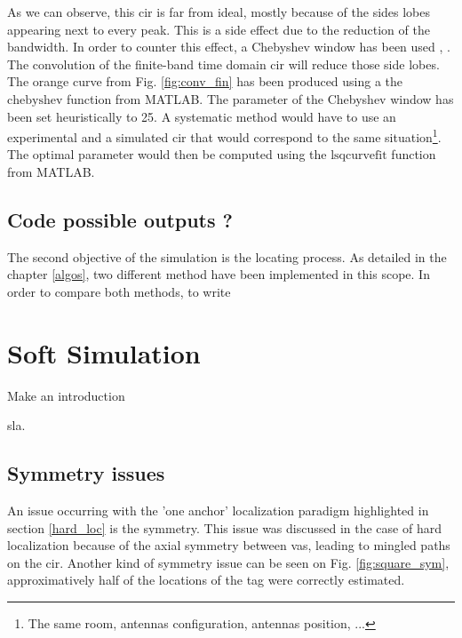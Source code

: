 As we can observe, this \gls{cir} is far from ideal, mostly because of the sides lobes appearing next to every peak. This is a side effect due to the reduction of the bandwidth. In order to counter this effect, a Chebyshev window has been used \cite{lynch1997dolph}, \cite{mathworks}. The convolution of the finite-band time domain \gls{cir} will reduce those side lobes. The orange curve from Fig. \ref{fig:conv_fin} has been produced using a the $\text{chebyshev}$ function from MATLAB. The parameter of the Chebyshev window has been set heuristically to 25. A systematic method would have to use an experimental and a simulated \gls{cir} that would correspond to the same situation\footnote{The same room, antennas configuration, antennas position, ...}. The optimal parameter would then be computed using the $\text{lsqcurvefit}$ function from MATLAB.

\subsection{Code possible outputs ?}

The second objective of the simulation is the locating process. As detailed in the chapter \ref{algos}, two different method have been implemented in this scope. In order to compare both methods, \color{red}
to write \color{black}


\section{Soft Simulation}

\color{red}
Make an introduction
\color{black}

\gls{sla}.

\subsection{Symmetry issues}

An issue occurring with the 'one anchor' localization paradigm highlighted in section \ref{hard_loc} is the symmetry. This issue was discussed in the case of hard localization because of the axial symmetry between \glspl{va}, leading to mingled paths on the \gls{cir}. Another kind of symmetry issue can be seen on Fig. \ref{fig:square_sym}, approximatively half of the locations of the tag were correctly estimated.

